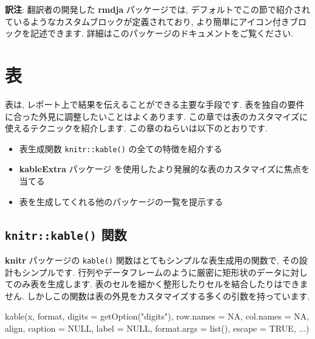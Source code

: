 \documentclass[
  11pt,
  lualatex,ja=standard,jafont=noto]{bxjsreport}
\newenvironment{Shaded}{\begin{snugshade}}{\end{snugshade}}
\newcommand{\AttributeTok}[1]{\textcolor[rgb]{0.77,0.63,0.00}{#1}}
\newcommand{\ConstantTok}[1]{\textcolor[rgb]{0.00,0.00,0.00}{#1}}
\newcommand{\FunctionTok}[1]{\textcolor[rgb]{0.00,0.00,0.00}{#1}}
\newcommand{\NormalTok}[1]{#1}
\newcommand{\StringTok}[1]{\textcolor[rgb]{0.31,0.60,0.02}{#1}}
\providecommand{\tightlist}{%
  \setlength{\itemsep}{0pt}\setlength{\parskip}{0pt}}
\begin{document}
\textbf{訳注}: 翻訳者の開発した \textbf{rmdja} パッケージでは, デフォルトでこの節で紹介されているようなカスタムブロックが定義されており, より簡単にアイコン付きブロックを記述できます. 詳細はこのパッケージのドキュメントをご覧ください.

\hypertarget{tables}{%
\chapter{表}\label{tables}}

表は, レポート上で結果を伝えることができる主要な手段です. 表を独自の要件に合った外見に調整したいことはよくあります. この章では表のカスタマイズに使えるテクニックを紹介します. この章のねらいは以下のとおりです.

\begin{itemize}
\tightlist
\item
  表生成関数 \texttt{knitr::kable()} の全ての特徴を紹介する
\item
  \textbf{kableExtra} パッケージ \autocite{R-kableExtra} を使用したより発展的な表のカスタマイズに焦点を当てる
\item
  表を生成してくれる他のパッケージの一覧を提示する
\end{itemize}

\hypertarget{kable}{%
\section{\texorpdfstring{\texttt{knitr::kable()} 関数}{knitr::kable() 関数}}\label{kable}}

\textbf{knitr} パッケージの \texttt{kable()} 関数はとてもシンプルな表生成用の関数で, その設計もシンプルです. 行列やデータフレームのように厳密に矩形状のデータに対してのみ表を生成します. 表のセルを細かく整形したりセルを結合したりはできません. しかしこの関数は表の外見をカスタマイズする多くの引数を持っています.

\begin{Shaded}
\begin{Highlighting}[numbers=left,,]
\FunctionTok{kable}\NormalTok{(x, format, }\AttributeTok{digits =} \FunctionTok{getOption}\NormalTok{(}\StringTok{"digits"}\NormalTok{), }\AttributeTok{row.names =} \ConstantTok{NA}\NormalTok{, }
  \AttributeTok{col.names =} \ConstantTok{NA}\NormalTok{, align, }\AttributeTok{caption =} \ConstantTok{NULL}\NormalTok{, }\AttributeTok{label =} \ConstantTok{NULL}\NormalTok{, }
  \AttributeTok{format.args =} \FunctionTok{list}\NormalTok{(), }\AttributeTok{escape =} \ConstantTok{TRUE}\NormalTok{, ...)}
\end{Highlighting}
\end{Shaded}
\end{document}
